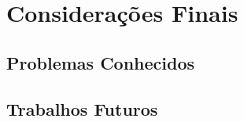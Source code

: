 \chapter{Considerações Finais}\label{consideracoes-finais}

\section{Problemas Conhecidos}

\section{Trabalhos Futuros}